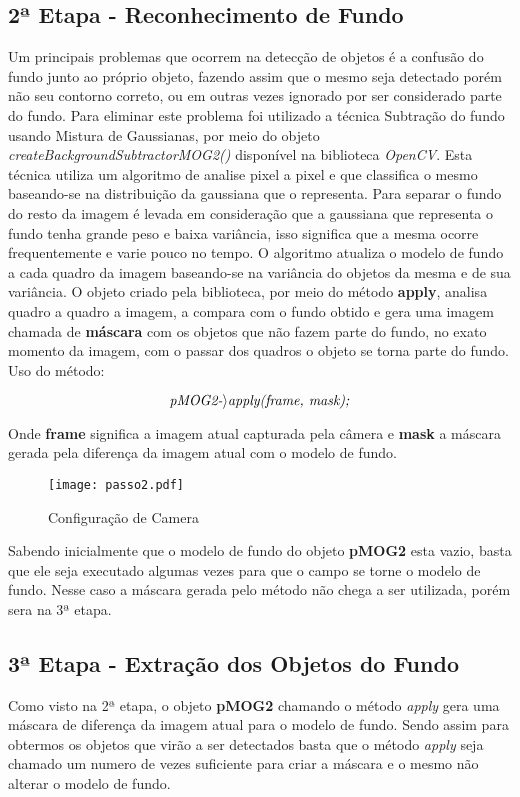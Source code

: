 	\subsection{2ª Etapa - Reconhecimento de Fundo}
	Um principais problemas que ocorrem na detecção de objetos é a confusão do fundo junto ao próprio objeto, fazendo assim que o mesmo seja detectado porém não seu contorno correto, ou em outras vezes ignorado por ser considerado parte do fundo. Para eliminar este problema foi utilizado a técnica  Subtração do fundo usando Mistura de Gaussianas, por meio do objeto \textit{createBackgroundSubtractorMOG2()} disponível na biblioteca \textit{OpenCV}. Esta técnica utiliza um algoritmo de analise pixel a pixel e que classifica o mesmo baseando-se na distribuição da gaussiana que o representa. Para separar o fundo do resto da imagem é levada em consideração que a gaussiana que representa o fundo tenha grande peso e baixa variância, isso significa que a mesma ocorre frequentemente e varie pouco no tempo. O algoritmo atualiza o modelo de fundo a cada quadro da imagem baseando-se na variância do objetos da mesma e de sua variância. O objeto criado pela biblioteca, por meio do método \textbf{apply}, analisa quadro a quadro a imagem, a compara com o fundo obtido e gera uma imagem chamada de \textbf{máscara} com os objetos que não fazem parte do fundo, no exato momento da imagem, com o passar dos quadros o objeto se torna parte do fundo. Uso do método:
\begin{center}
 \begin{displaymath}  \centering \textit{pMOG2-$\rangle$apply(frame, mask);}  \end{displaymath}

\end{center}

Onde \textbf{frame} significa a imagem atual capturada pela câmera e \textbf{mask} a máscara gerada pela diferença da imagem atual com o modelo de fundo. 

\begin{figure}[H]
			\centering
			\texttt{[image: passo2.pdf]}
			\caption{Configuração de Camera}
			\label{Configuracao}
		\end{figure}		


Sabendo inicialmente que o modelo de fundo do objeto \textbf{pMOG2} esta vazio, basta que ele seja executado algumas vezes para que o campo se torne o modelo de fundo. Nesse caso a máscara gerada pelo método não chega a ser utilizada, porém sera na 3ª etapa.
	\subsection{3ª Etapa - Extração dos Objetos do Fundo}
	Como visto na 2ª etapa, o objeto \textbf{pMOG2} chamando o método \textit{apply} gera uma máscara de diferença da imagem atual para o modelo de fundo. Sendo assim para obtermos os objetos que virão a ser detectados basta que o método \textit{apply} seja chamado um numero de vezes suficiente para criar a máscara e o mesmo não alterar o modelo de fundo.
	
